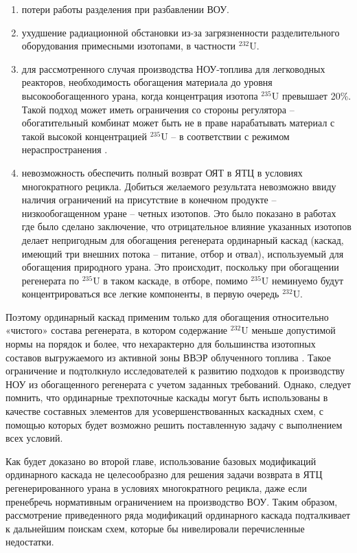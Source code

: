 \begin{enumerate}
  \item потери работы разделения при разбавлении ВОУ.
  \item ухудшение радиационной обстановки из-за загрязненности разделительного оборудования примесными изотопами, в частности $^{232}$U.
  \item для рассмотренного случая производства НОУ-топлива для легководных реакторов, необходимость обогащения материала до уровня высокообогащенного урана, когда концентрация изотопа $^{235}$U превышает 20\%.
  Такой подход может иметь ограничения со стороны регулятора -- обогатительный комбинат может быть не в праве нарабатывать материал с такой высокой концентрацией $^{235}$U -- в соответствии с режимом нераспространения \cite{brownOriginsSignificanceLimit2016}.
  \item невозможность обеспечить полный возврат ОЯТ в ЯТЦ в условиях многократного рецикла. Добиться желаемого результата невозможно ввиду наличия ограничений на присутствие в конечном продукте -- низкообогащенном уране -- четных изотопов. Это было показано в работах \cite{sulaberidzeNekotoryhRazdelitelnyhProblemah2004,sulaberidzeProblemsRefinementRecycled4, smirnovKaskadnyeShemyZadachah2012} где было сделано заключение, что отрицательное влияние указанных изотопов делает непригодным для обогащения регенерата ординарный каскад (каскад, имеющий три внешних потока – питание, отбор и отвал), используемый для обогащения природного урана. Это происходит, поскольку при обогащении регенерата по $^{235}$U в таком каскаде, в отборе, помимо $^{235}$U неминуемо будут концентрироваться все легкие компоненты, в первую очередь $^{232}$U.
\end{enumerate}

Поэтому ординарный каскад применим только для обогащения относительно «чистого» состава регенерата, в котором содержание $^{232}$U меньше допустимой нормы на порядок и более, что нехарактерно для большинства изотопных составов выгружаемого из активной зоны ВВЭР облученного топлива \cite{bormanTehnikoekonomicheskiyAnalizVozmozhnyh2012}. Такое ограничение и подтолкнуло исследователей к развитию подходов к производству НОУ из обогащенного регенерата с учетом заданных требований. Однако, следует помнить, что ординарные трехпоточные каскады могут быть использованы в качестве составных элементов для усовершенствованных каскадных схем, с помощью которых будет возможно решить поставленную задачу с выполнением всех условий.

Как будет доказано во второй главе, использование базовых модификаций ординарного каскада не целесообразно для решения задачи возврата в ЯТЦ регенерированного урана в условиях многократного рецикла, даже если пренебречь нормативным ограничением на производство ВОУ.
Таким образом, рассмотрение приведенного ряда модификаций ординарного каскада подталкивает к дальнейшим поискам схем, которые бы нивелировали перечисленные недостатки.

